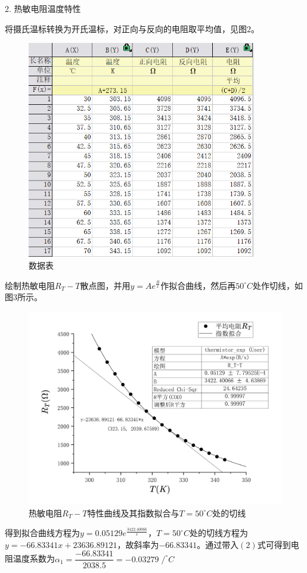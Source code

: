 \documentclass[11pt]{article}
\begin{document}
2. 热敏电阻温度特性

将摄氏温标转换为开氏温标，对正向与反向的电阻取平均值，见图$2$。
\begin{figure}[H]
    \centering
    \includegraphics[width=10cm]{Figs/数据.png}
    \caption{数据表}
\end{figure}

绘制热敏电阻$R_T-T$散点图，并用$y=Ae^{\frac{B}{x}}$作拟合曲线，然后再$50^{\circ}C$处作切线，如图$3$所示。
\begin{figure}[H]
    \centering
    \includegraphics[width=16cm]{Figs/Graph1.png}
    \caption{热敏电阻$R_T-T$特性曲线及其指数拟合与$T=50^{\circ}C$处的切线}
\end{figure}
得到拟合曲线方程为$y=0.05129e^{\frac{3422.40066}{x}}$，$T=50^{\circ}C$处的切线方程为$y=-66.83341x+23636.89121$，故斜率为$-66.83341$。通过带入$(2)$式可得到电阻温度系数为$\alpha_1=\dfrac{-66.83341}{2038.5}=-0.03279\;/^{\circ}C$
\end{document}
